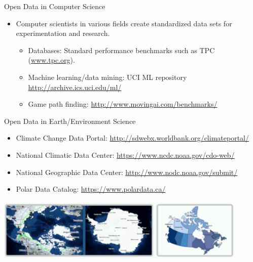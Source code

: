 \documentclass[xcolor=svgnames]{beamer}
\newcommand{\nl}{\\[1em]}
\begin{document}
\begin{frame}{Open Data in Computer Science}
\begin{itemize}
\item Computer scientists in various fields create standardized data sets for experimentation and research.\nl

\begin{itemize}
\item  Databases: Standard performance benchmarks such as TPC (\url{www.tpc.org}).\medskip
\item Machine learning/data mining: UCI ML repository \url{http://archive.ics.uci.edu/ml/} \medskip
\item Game path finding: \url{http://www.movingai.com/benchmarks/}\medskip
\end{itemize}


\end{itemize}
\end{frame}

\begin{frame}{Open Data in Earth/Environment Science}
\begin{itemize}
\item Climate Change Data Portal: \url{http://sdwebx.worldbank.org/climateportal/}\medskip
\item National Climatic Data Center: \url{https://www.ncdc.noaa.gov/cdo-web/}\medskip
\item National Geographic Data Center: \url{http://www.nodc.noaa.gov/submit/}\medskip
\item Polar Data Catalog: \url{https://www.polardata.ca/}\medskip
\end{itemize}
\begin{center}
\includegraphics[width=0.9\textwidth]{img/earth}
\end{center}

\end{frame}
\end{document}
